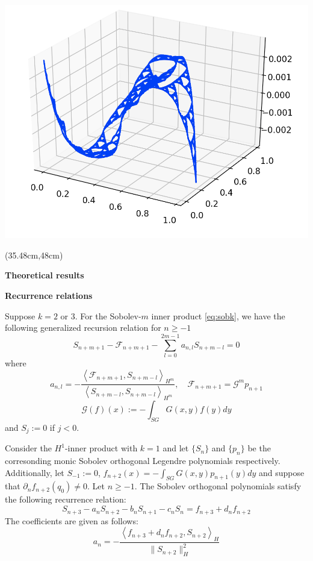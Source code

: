 \documentclass[a0, landscape]{a0poster}
\newcommand{\inner}[2]{\left \langle #1, #2\right \rangle}
\begin{document}
{\begin{textblock*}{25in}
\begin{minipage}{21in}
        \includegraphics[width=0.33\linewidth]{Final_presentation/images/chebyshev_p13_0_02750235.png}
    \end{minipage}
  \end{textblock*}%
}

{%
\begin{textblock*}{25in}(35.48cm,48cm)%
    \begin{minipage}{21in}
      \begin{center}
        {\LARGE \textcolor{CornellRed}{\textbf{Theoretical results}}}
      \end{center}
    \begin{multicols}{2}
    \begin{center}
        {\Large \textcolor{CornellRed}{\textbf{Recurrence relations}}}
      \end{center}
    \begin{theorem*}\label{th:gen_rec}
    Suppose $k=2$ or $3$. For the Sobolev-$m$ inner product \eqref{eq:sobk}, we have the following generalized recursion relation for $n\ge -1$
    $$S_{n+m+1} - \mathcal{F}_{n+m+1} - \sum\limits_{l = 0}^{2m-1}a_{n, l}S_{n+m-l} = 0$$
    where
    $$a_{n, l} = -\frac{\inner{\mathcal{F}_{n+m+1}}{S_{n+m-l}}_{H^m}}{\inner{S_{n+m-l}}{S_{n+m-l}}_{H^m}}, \quad \mathcal{F}_{n+m+1} = \mathcal{G}^mp_{n+1}$$
      $$ \mathcal{G}(f)(x) := -\int_{SG}G(x,y)f(y)dy$$
    and $S_j:=0$ if $j<0$.\end{theorem*}
    \begin{theorem*}\label{Recurrence Relation with one assumption $(k=1)$}
    Consider the $H^1$-inner product with $k=1$ and let $\{S_n\}$ and $\{p_n\}$ be the corresonding monic Sobolev orthogonal Legendre polynomials respectively. Additionally, let $S_{-1}:=0$, $f_{n+2}(x) = -\int_{SG}G(x,y)p_{n+1}(y)dy$ and suppose that $\partial_n f_{n+2}(q_0)\neq 0$. Let $n\geq-1$. The Sobolev orthogonal polynomials satisfy the following recurrence relation:
         $$S_{n+3}-a_nS_{n+2} - b_nS_{n+1}-c_nS_n = f_{n+3}+d_nf_{n+2}$$
        The coefficients are given as follows:
        $$ a_n=-\frac{\inner{f_{n+3}+d_nf_{n+2}}{S_{n+2}}_H}{\|S_{n+2}\|_H^2}$$

\end{theorem*}
\end{multicols}
\end{minipage}
\end{textblock*}}
\end{document}
